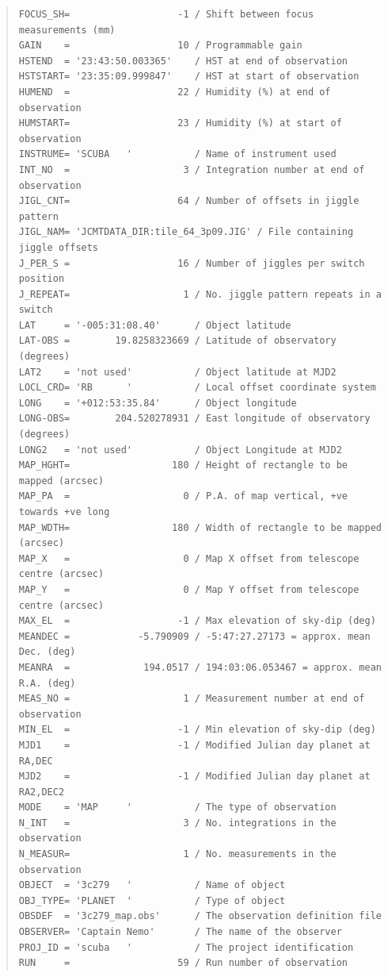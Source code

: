 \documentclass[twoside,11pt]{article}
\newenvironment{myquote}{\begin{quote}\begin{small}}{\end{small}\end{quote}}
\renewcommand{\_}{\texttt{\symbol{95}}}
\begin{document}
\begin{myquote}
\begin{verbatim}
FOCUS_SH=                   -1 / Shift between focus measurements (mm)
GAIN    =                   10 / Programmable gain
HSTEND  = '23:43:50.003365'    / HST at end of observation
HSTSTART= '23:35:09.999847'    / HST at start of observation
HUMEND  =                   22 / Humidity (%) at end of observation
HUMSTART=                   23 / Humidity (%) at start of observation
INSTRUME= 'SCUBA   '           / Name of instrument used
INT_NO  =                    3 / Integration number at end of observation
JIGL_CNT=                   64 / Number of offsets in jiggle pattern
JIGL_NAM= 'JCMTDATA_DIR:tile_64_3p09.JIG' / File containing jiggle offsets
J_PER_S =                   16 / Number of jiggles per switch position
J_REPEAT=                    1 / No. jiggle pattern repeats in a switch
LAT     = '-005:31:08.40'      / Object latitude
LAT-OBS =        19.8258323669 / Latitude of observatory (degrees)
LAT2    = 'not used'           / Object latitude at MJD2
LOCL_CRD= 'RB      '           / Local offset coordinate system
LONG    = '+012:53:35.84'      / Object longitude
LONG-OBS=        204.520278931 / East longitude of observatory (degrees)
LONG2   = 'not used'           / Object Longitude at MJD2
MAP_HGHT=                  180 / Height of rectangle to be mapped (arcsec)
MAP_PA  =                    0 / P.A. of map vertical, +ve towards +ve long
MAP_WDTH=                  180 / Width of rectangle to be mapped (arcsec)
MAP_X   =                    0 / Map X offset from telescope centre (arcsec)
MAP_Y   =                    0 / Map Y offset from telescope centre (arcsec)
MAX_EL  =                   -1 / Max elevation of sky-dip (deg)
MEANDEC =            -5.790909 / -5:47:27.27173 = approx. mean Dec. (deg)
MEANRA  =             194.0517 / 194:03:06.053467 = approx. mean R.A. (deg)
MEAS_NO =                    1 / Measurement number at end of observation
MIN_EL  =                   -1 / Min elevation of sky-dip (deg)
MJD1    =                   -1 / Modified Julian day planet at RA,DEC
MJD2    =                   -1 / Modified Julian day planet at RA2,DEC2
MODE    = 'MAP     '           / The type of observation
N_INT   =                    3 / No. integrations in the observation
N_MEASUR=                    1 / No. measurements in the observation
OBJECT  = '3c279   '           / Name of object
OBJ_TYPE= 'PLANET  '           / Type of object
OBSDEF  = '3c279_map.obs'      / The observation definition file
OBSERVER= 'Captain Nemo'       / The name of the observer
PROJ_ID = 'scuba   '           / The project identification
RUN     =                   59 / Run number of observation

\end{verbatim}
\end{myquote}
\end{document}
